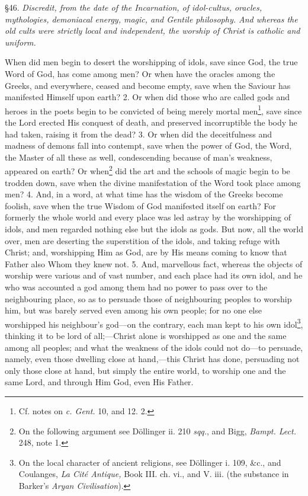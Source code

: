 
§46. \emph{Discredit, from the date of the Incarnation, of idol-cultus, oracles, mythologies, demoniacal energy, magic, and Gentile philosophy. And whereas the old cults were strictly local and independent, the worship of Christ is catholic and uniform.}

When did men begin to desert the worshipping of idols, save since God, the true Word of God, has come among men? Or when have the oracles among the Greeks, and everywhere, ceased and become empty, save when the Saviour has manifested Himself upon earth? 2. Or when did those who are called gods and heroes in the poets begin to be convicted of being merely mortal men\footnote{Cf. notes on \emph{c. Gent.} 10, and 12. 2.}, save since the Lord erected His conquest of death, and preserved incorruptible the body he had taken, raising it from the dead? 3. Or when did the deceitfulness and madness of demons fall into contempt, save when the power of God, the Word, the Master of all these as well, condescending because of man’s weakness, appeared on earth? Or when\footnote{On the following argument see Döllinger ii. 210 \emph{sqq.}, and Bigg, \emph{Bampt. Lect.} 248, note 1.} did the art and the schools of magic begin to be trodden down, save when the divine manifestation of the Word took place among men? 4. And, in a word, at what time has the wisdom of the Greeks become foolish, save when the true Wisdom of God manifested itself on earth? For formerly the whole world and every place was led astray by the worshipping of idols, and men regarded nothing else but the idols as gods. But now, all the world over, men are deserting the superstition of the idols, and taking refuge with Christ; and, worshipping Him as God, are by His means coming to know that Father also Whom they knew not. 5. And, marvellous fact, whereas the objects of worship were various and of vast number, and each place had its own idol, and he who was accounted a god among them had no power to pass over to the neighbouring place, so as to persuade those of neighbouring peoples to worship him, but was barely served even among his own people; for no one else worshipped his neighbour’s god—on the contrary, each man kept to his own idol\footnote{On the local character of ancient religions, see Döllinger i. 109, \&c., and Coulanges, \emph{La Cité Antique,} Book III. ch. vi., and V. iii. (the substance in Barker’s \emph{Aryan Civilisation}).}, thinking it to be lord of all;—Christ alone is worshipped as one and the same among all peoples; and what the weakness of the idols could not do—to persuade, namely, even those dwelling close at hand,—this Christ has done, persuading not only those close at hand, but simply the entire world, to worship one and the same Lord, and through Him God, even His Father.


